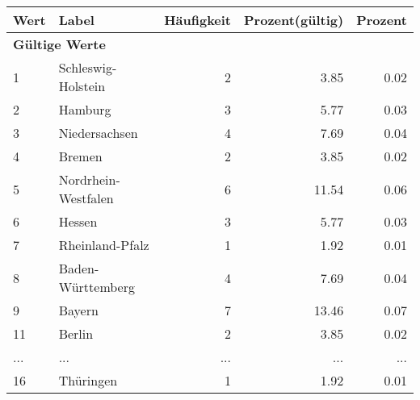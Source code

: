      \begin{longtable}{lXrrr}
     \toprule
     \textbf{Wert} & \textbf{Label} & \textbf{Häufigkeit} & \textbf{Prozent(gültig)} & \textbf{Prozent} \\
     \endhead
     \midrule
     \multicolumn{5}{l}{\textbf{Gültige Werte}}\\
        1 & \multicolumn{1}{X}{Schleswig-Holstein} & %
          \num{2} &
          \num[round-mode=places,round-precision=2]{3,85} &
          \num[round-mode=places,round-precision=2]{0,02} \\
        2 & \multicolumn{1}{X}{Hamburg} & %
          \num{3} &
          \num[round-mode=places,round-precision=2]{5,77} &
          \num[round-mode=places,round-precision=2]{0,03} \\
        3 & \multicolumn{1}{X}{Niedersachsen} & %
          \num{4} &
          \num[round-mode=places,round-precision=2]{7,69} &
          \num[round-mode=places,round-precision=2]{0,04} \\
        4 & \multicolumn{1}{X}{Bremen} & %
          \num{2} &
          \num[round-mode=places,round-precision=2]{3,85} &
          \num[round-mode=places,round-precision=2]{0,02} \\
        5 & \multicolumn{1}{X}{Nordrhein-Westfalen} & %
          \num{6} &
          \num[round-mode=places,round-precision=2]{11,54} &
          \num[round-mode=places,round-precision=2]{0,06} \\
        6 & \multicolumn{1}{X}{Hessen} & %
          \num{3} &
          \num[round-mode=places,round-precision=2]{5,77} &
          \num[round-mode=places,round-precision=2]{0,03} \\
        7 & \multicolumn{1}{X}{Rheinland-Pfalz} & %
          \num{1} &
          \num[round-mode=places,round-precision=2]{1,92} &
          \num[round-mode=places,round-precision=2]{0,01} \\
        8 & \multicolumn{1}{X}{Baden-Württemberg} & %
          \num{4} &
          \num[round-mode=places,round-precision=2]{7,69} &
          \num[round-mode=places,round-precision=2]{0,04} \\
        9 & \multicolumn{1}{X}{Bayern} & %
          \num{7} &
          \num[round-mode=places,round-precision=2]{13,46} &
          \num[round-mode=places,round-precision=2]{0,07} \\
        11 & \multicolumn{1}{X}{Berlin} & %
          \num{2} &
          \num[round-mode=places,round-precision=2]{3,85} &
          \num[round-mode=places,round-precision=2]{0,02} \\
       ... & ... & ... & ... & ... \\
        16 & \multicolumn{1}{X}{Thüringen} & %
          \num{1} &
          \num[round-mode=places,round-precision=2]{1,92} &
          \num[round-mode=places,round-precision=2]{0,01} \\


\end{longtable}
